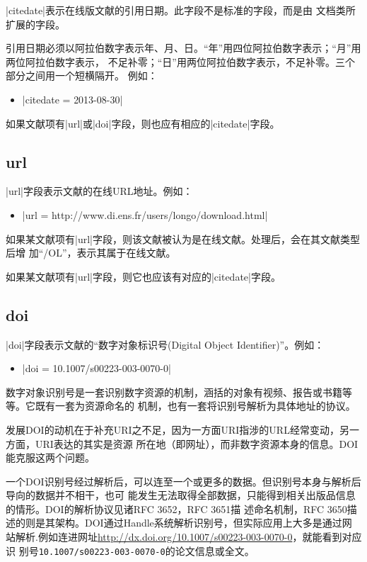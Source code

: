 |citedate|表示在线版文献的引用日期。此字段不是标准的{\BibTeX}字段，而是由{\njuthesis}
文档类所扩展的字段。

引用日期必须以阿拉伯数字表示年、月、日。“年”用四位阿拉伯数字表示；“月”用两位阿拉伯数字表示，
不足补零；“日”用两位阿拉伯数字表示，不足补零。三个部分之间用一个短横隔开。
例如：
\begin{itemize}
\item |citedate = {2013-08-30}|
\end{itemize}

如果文献项有|url|或|doi|字段，则也应有相应的|citedate|字段。

\subsection{url}\label{subsec:url}

|url|字段表示文献的在线URL地址。例如：
\begin{itemize}
\item |url = {http://www.di.ens.fr/users/longo/download.html}|
\end{itemize}

如果某文献项有|url|字段，则该文献被认为是在线文献。{\BibTeX}处理后，会在其文献类型后增
加``/OL''，表示其属于在线文献。

如果某文献项有|url|字段，则它也应该有对应的|citedate|字段。

\subsection{doi}\label{subsec:doi}

|doi|字段表示文献的``数字对象标识号(Digital Object Identifier)''。例如：
\begin{itemize}
\item |doi = {10.1007/s00223-003-0070-0}|
\end{itemize}

数字对象识别号是一套识别数字资源的机制，涵括的对象有视频、报告或书籍等等。它既有一套为资源命名的
机制，也有一套将识别号解析为具体地址的协议。

发展DOI的动机在于补充URI之不足，因为一方面URI指涉的URL经常变动，另一方面，URI表达的其实是资源
所在地（即网址），而非数字资源本身的信息。DOI能克服这两个问题。

一个DOI识别号经过解析后，可以连至一个或更多的数据。但识别号本身与解析后导向的数据并不相干，也可
能发生无法取得全部数据，只能得到相关出版品信息的情形。DOI的解析协议见诸RFC 3652，RFC 3651描
述命名机制，RFC 3650描述的则是其架构。DOI通过Handle系统解析识别号，但实际应用上大多是通过网
站解析.例如连进网址\url{http://dx.doi.org/10.1007/s00223-003-0070-0}，就能看到对应识
别号\texttt{10.1007/s00223-003-0070-0}的论文信息或全文。

